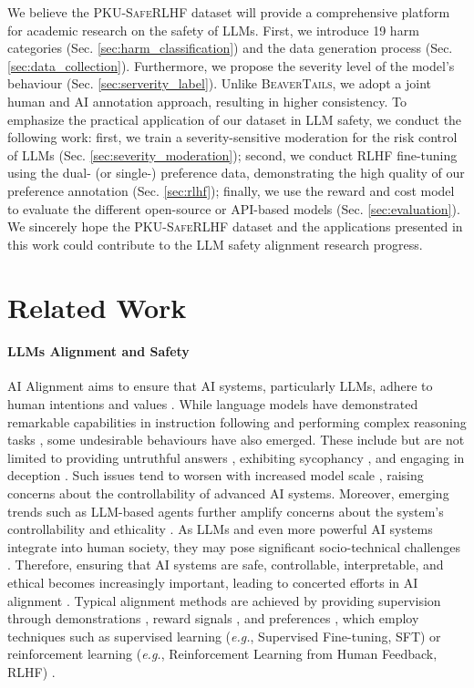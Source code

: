 \documentclass[11pt]{article}
\theoremstyle{plain}
\theoremstyle{definition}
\theoremstyle{remark}
\newcommand{\db}{\textsc{PKU-SafeRLHF}}
\begin{document}
We believe the \db{} dataset will provide a comprehensive platform for academic research on the safety of LLMs. First, we introduce 19 harm categories (Sec. \ref{sec:harm_classification}) and the data generation process (Sec. \ref{sec:data_collection}). Furthermore, we propose the severity level of the model's behaviour (Sec. \ref{sec:serverity_label}). Unlike \textsc{BeaverTails}, we adopt a joint human and AI annotation approach, resulting in higher consistency. To emphasize the practical application of our dataset in LLM safety, we conduct the following work: first, we train a severity-sensitive moderation for the risk control of LLMs (Sec. \ref{sec:severity_moderation}); second, we conduct RLHF fine-tuning using the dual- (or single-) preference data, demonstrating the high quality of our preference annotation (Sec. \ref{sec:rlhf}); finally, we use the reward and cost model to evaluate the different open-source or API-based models (Sec. \ref{sec:evaluation}). 
We sincerely hope the \db{} dataset and the applications presented in this work could contribute to the LLM safety alignment research progress.



\section{Related Work}
\paragraph{LLMs Alignment and Safety} 
AI Alignment aims to ensure that AI systems, particularly LLMs, adhere to human intentions and values \citep{ji2023ai}. While language models have demonstrated remarkable capabilities in instruction following \citep{ouyang2022training, ji2024align} and performing complex reasoning tasks \citep{touvron2023llama, achiam2023gpt}, some undesirable behaviours have also emerged. These include but are not limited to providing untruthful answers \citep{bang2023multitask, Wan2023BiasAskerMT, Wang2023NotAC}, exhibiting sycophancy \citep{perez2023discovering, sharma2024towards}, and engaging in deception \citep{jacob2023, park2024ai}. Such issues tend to worsen with increased model scale \citep{perez2023discovering}, raising concerns about the controllability of advanced AI systems. Moreover, emerging trends such as LLM-based agents \citep{xi2023rise,wang2024survey} further amplify concerns about the system's controllability and ethicality \citep{chan2023harms}. As LLMs and even more powerful AI systems integrate into human society, they may pose significant socio-technical challenges \citep{statement_on_ai_risk_2023}. Therefore, ensuring that AI systems are safe, controllable, interpretable, and ethical becomes increasingly important, leading to concerted efforts in AI alignment \citep{ji2023ai}. Typical alignment methods are achieved by providing supervision through demonstrations \citep{brown2020language, taori2023stanford}, reward signals \citep{ouyang2022training}, and preferences \citep{christiano2017deep}, which employ techniques such as supervised learning (\textit{e.g.}, Supervised Fine-tuning, SFT) or reinforcement learning (\textit{e.g.}, Reinforcement Learning from Human Feedback, RLHF) \citep{ouyang2022training}.
\end{document}
